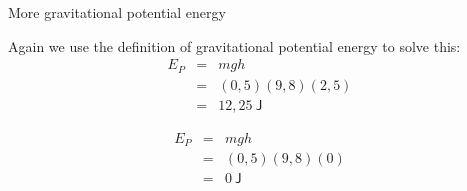 \begin{wex}{More gravitational potential energy}
{
Again we use the definition of gravitational potential energy to solve this:
\begin{eqnarray*}
E_{P} &=& mgh \\
& = & (0,5)(9,8)(2,5) \\
& = & 12,25  \ \mathsf{J}
\end{eqnarray*}

\begin{eqnarray*}
E_{P} &=& mgh \\
& = & (0,5)(9,8)(0) \\
& = & 0  \ \mathsf{J}
\end{eqnarray*}

}
\end{wex}


